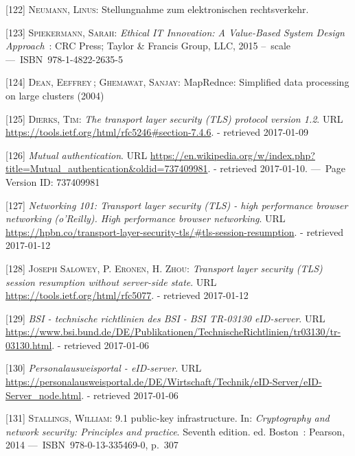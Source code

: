 \documentclass[12pt,english,a4paper,titlepage,cleardoublepage=empty,dottedtoc]{report}
\begin{document}
\hypertarget{ref-statement_2013_de-mail}{}
{[}122{]} \textsc{Neumann, Linus}: Stellungnahme zum elektronischen
rechtsverkehr.

\hypertarget{ref-book_2015_ethical-it-innovation}{}
{[}123{]} \textsc{Spiekermann, Sarah}: \emph{Ethical IT Innovation: A
Value-Based System Design Approach}~: CRC Press; Taylor \& Francis
Group, LLC, 2015 --~scale ---~ISBN~978-1-4822-2635-5

\hypertarget{ref-paper_2004_distributed-mapreduce}{}
{[}124{]} \textsc{Dean, Eeffrey}\,; \textsc{Ghemawat, Sanjay}:
MapRednce: Simplified data processing on large clusters (2004)

\hypertarget{ref-web_spec_tls-12_client-auth}{}
{[}125{]} \textsc{Dierks, Tim}: \emph{The transport layer security (TLS)
protocol version 1.2}. URL
\url{https://tools.ietf.org/html/rfc5246\#section-7.4.6}. - retrieved
2017-01-09

\hypertarget{ref-web_2017_wikipedia_mutual-auth}{}
{[}126{]} \emph{Mutual authentication}. URL
\url{https://en.wikipedia.org/w/index.php?title=Mutual_authentication\&oldid=737409981}.
- retrieved 2017-01-10. ---~Page Version ID: 737409981

\hypertarget{ref-book_2013_networking-101_tls-session-resumption}{}
{[}127{]} \emph{Networking 101: Transport layer security (TLS) - high
performance browser networking (o'Reilly). High performance browser
networking}. URL
\url{https://hpbn.co/transport-layer-security-tls/\#tls-session-resumption}.
- retrieved 2017-01-12

\hypertarget{ref-web_spec_tls-session-ticket-resumption}{}
{[}128{]} \textsc{Joseph Salowey, P. Eronen, \textnormal{H. Zhou}}:
\emph{Transport layer security (TLS) session resumption without
server-side state}. URL \url{https://tools.ietf.org/html/rfc5077}. -
retrieved 2017-01-12

\hypertarget{ref-web_bsi-spec_eid}{}
{[}129{]} \emph{BSI - technische richtlinien des BSI - BSI TR-03130
eID-server}. URL
\url{https://www.bsi.bund.de/DE/Publikationen/TechnischeRichtlinien/tr03130/tr-03130.html}.
- retrieved 2017-01-06

\hypertarget{ref-web_2017_npa-eid-server}{}
{[}130{]} \emph{Personalausweisportal - eID-server}. URL
\url{https://personalausweisportal.de/DE/Wirtschaft/Technik/eID-Server/eID-Server_node.html}.
- retrieved 2017-01-06

\hypertarget{ref-book_2014_chapter-10-5-asym-random-number-gen}{}
{[}131{]} \textsc{Stallings, William}: 9.1 public-key infrastructure.
In: \emph{Cryptography and network security: Principles and practice}.
Seventh edition. ed. Boston~: Pearson, 2014 ---~ISBN~978-0-13-335469-0,
p.~307
\end{document}

